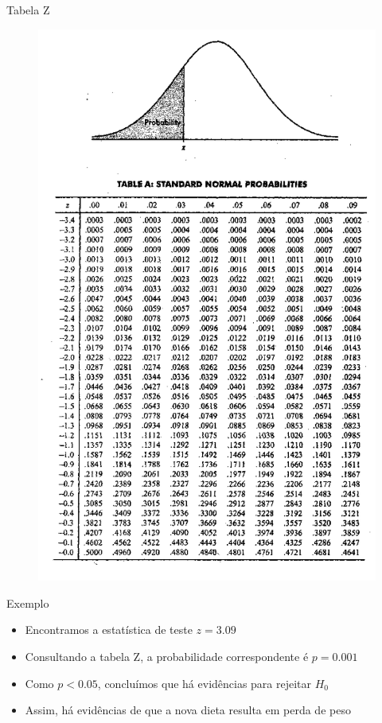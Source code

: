 \documentclass{beamer}
\begin{document}
\begin{frame}{Tabela Z}
  \begin{figure}
    \centering
      \includegraphics[height=0.9\textheight]{TH_II/z_table}
  \end{figure}
\end{frame}

\begin{frame}{Exemplo}
  \begin{example}
    \begin{itemize}
    \item Encontramos a estatística de teste $z=3.09$
    \item Consultando a tabela Z, a probabilidade correspondente é
      \alert{$p=0.001$}
    \item Como $p<0.05$, concluímos que há evidências para rejeitar $H_0$
    \item Assim, há evidências de que a nova dieta resulta em perda de
      peso
    \end{itemize}
  \end{example}
\end{frame}
\end{document}
